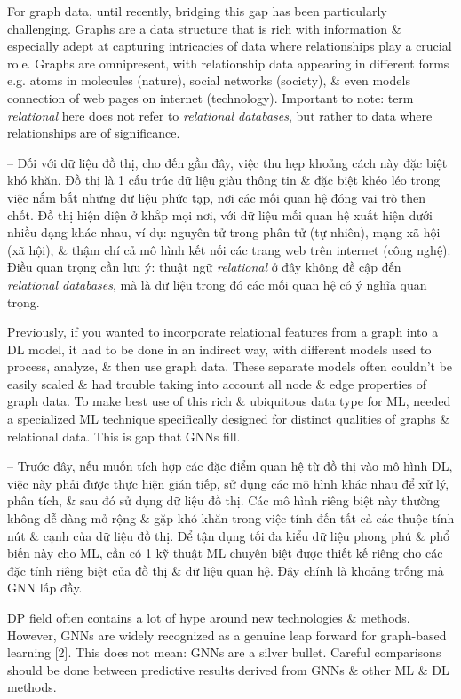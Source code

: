 \documentclass{article}
\begin{document}
\begin{itemize}
    For graph data, until recently, bridging this gap has been particularly challenging. Graphs are a data structure that is rich with information \& especially adept at capturing intricacies of data where relationships play a crucial role. Graphs are omnipresent, with relationship data appearing in different forms e.g. atoms in molecules (nature), social networks (society), \& even models connection of web pages on internet (technology). Important to note: term {\it relational} here does not refer to {\it relational databases}, but rather to data where relationships are of significance.

    -- Đối với dữ liệu đồ thị, cho đến gần đây, việc thu hẹp khoảng cách này đặc biệt khó khăn. Đồ thị là 1 cấu trúc dữ liệu giàu thông tin \& đặc biệt khéo léo trong việc nắm bắt những dữ liệu phức tạp, nơi các mối quan hệ đóng vai trò then chốt. Đồ thị hiện diện ở khắp mọi nơi, với dữ liệu mối quan hệ xuất hiện dưới nhiều dạng khác nhau, ví dụ: nguyên tử trong phân tử (tự nhiên), mạng xã hội (xã hội), \& thậm chí cả mô hình kết nối các trang web trên internet (công nghệ). Điều quan trọng cần lưu ý: thuật ngữ {\it relational} ở đây không đề cập đến {\it relational databases}, mà là dữ liệu trong đó các mối quan hệ có ý nghĩa quan trọng.

    Previously, if you wanted to incorporate relational features from a graph into a DL model, it had to be done in an indirect way, with different models used to process, analyze, \& then use graph data. These separate models often couldn't be easily scaled \& had trouble taking into account all node \& edge properties of graph data. To make best use of this rich \& ubiquitous data type for ML, needed a specialized ML technique specifically designed for distinct qualities of graphs \& relational data. This is gap that GNNs fill.

    -- Trước đây, nếu muốn tích hợp các đặc điểm quan hệ từ đồ thị vào mô hình DL, việc này phải được thực hiện gián tiếp, sử dụng các mô hình khác nhau để xử lý, phân tích, \& sau đó sử dụng dữ liệu đồ thị. Các mô hình riêng biệt này thường không dễ dàng mở rộng \& gặp khó khăn trong việc tính đến tất cả các thuộc tính nút \& cạnh của dữ liệu đồ thị. Để tận dụng tối đa kiểu dữ liệu phong phú \& phổ biến này cho ML, cần có 1 kỹ thuật ML chuyên biệt được thiết kế riêng cho các đặc tính riêng biệt của đồ thị \& dữ liệu quan hệ. Đây chính là khoảng trống mà GNN lấp đầy.

    DP field often contains a lot of hype around new technologies \& methods. However, GNNs are widely recognized as a genuine leap forward for graph-based learning [2]. This does not mean: GNNs are a silver bullet. Careful comparisons should be done between predictive results derived from GNNs \& other ML \& DL methods.


\end{itemize}
\end{document}
